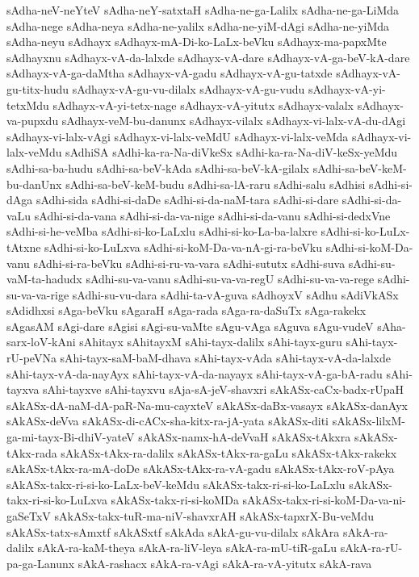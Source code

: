 {sAdha-neV-neYteV
sAdha-neY-satxtaH
sAdha-ne-ga-Lalilx
sAdha-ne-ga-LiMda
sAdha-nege
sAdha-neya
sAdha-ne-yalilx
sAdha-ne-yiM-dAgi
sAdha-ne-yiMda
sAdha-neyu
sAdhayx
sAdhayx-mA-Di-ko-LaLx-beVku
sAdhayx-ma-papxMte
sAdhayxnu
sAdhayx-vA-da-lalxde
sAdhayx-vA-dare
sAdhayx-vA-ga-beV-kA-dare
sAdhayx-vA-ga-daMtha
sAdhayx-vA-gadu
sAdhayx-vA-gu-tatxde
sAdhayx-vA-gu-titx-hudu
sAdhayx-vA-gu-vu-dilalx
sAdhayx-vA-gu-vudu
sAdhayx-vA-yi-tetxMdu
sAdhayx-vA-yi-tetx-nage
sAdhayx-vA-yitutx
sAdhayx-valalx
sAdhayx-va-pupxdu
sAdhayx-veM-bu-danunx
sAdhayx-vilalx
sAdhayx-vi-lalx-vA-du-dAgi
sAdhayx-vi-lalx-vAgi
sAdhayx-vi-lalx-veMdU
sAdhayx-vi-lalx-veMda
sAdhayx-vi-lalx-veMdu
sAdhiSA
sAdhi-ka-ra-Na-diVkeSx
sAdhi-ka-ra-Na-diV-keSx-yeMdu
sAdhi-sa-ba-hudu
sAdhi-sa-beV-kAda
sAdhi-sa-beV-kA-gilalx
sAdhi-sa-beV-keM-bu-danUnx
sAdhi-sa-beV-keM-budu
sAdhi-sa-lA-raru
sAdhi-salu
sAdhisi
sAdhi-si-dAga
sAdhi-sida
sAdhi-si-daDe
sAdhi-si-da-naM-tara
sAdhi-si-dare
sAdhi-si-da-vaLu
sAdhi-si-da-vana
sAdhi-si-da-va-nige
sAdhi-si-da-vanu
sAdhi-si-dedxVne
sAdhi-si-he-veMba
sAdhi-si-ko-LaLxlu
sAdhi-si-ko-La-ba-lalxre
sAdhi-si-ko-LuLx-tAtxne
sAdhi-si-ko-LuLxva
sAdhi-si-koM-Da-va-nA-gi-ra-beVku
sAdhi-si-koM-Da-vanu
sAdhi-si-ra-beVku
sAdhi-si-ru-va-vara
sAdhi-sututx
sAdhi-suva
sAdhi-su-vaM-ta-hadudx
sAdhi-su-va-vanu
sAdhi-su-va-va-regU
sAdhi-su-va-va-rege
sAdhi-su-va-va-rige
sAdhi-su-vu-dara
sAdhi-ta-vA-guva
sAdhoyxV
sAdhu
sAdiVkASx
sAdidhxsi
sAga-beVku
sAgaraH
sAga-rada
sAga-ra-daSuTx
sAga-rakekx
sAgasAM
sAgi-dare
sAgisi
sAgi-su-vaMte
sAgu-vAga
sAguva
sAgu-vudeV
sAha-sarx-loV-kAni
sAhitayx
sAhitayxM
sAhi-tayx-dalilx
sAhi-tayx-guru
sAhi-tayx-rU-peVNa
sAhi-tayx-saM-baM-dhava
sAhi-tayx-vAda
sAhi-tayx-vA-da-lalxde
sAhi-tayx-vA-da-nayAyx
sAhi-tayx-vA-da-nayayx
sAhi-tayx-vA-ga-bA-radu
sAhi-tayxva
sAhi-tayxve
sAhi-tayxvu
sAja-sA-jeV-shavxri
sAkASx-caCx-badx-rUpaH
sAkASx-dA-naM-dA-paR-Na-mu-cayxteV
sAkASx-daBx-vasayx
sAkASx-danAyx
sAkASx-deVva
sAkASx-di-cACx-sha-kitx-ra-jA-yata
sAkASx-diti
sAkASx-lilxM-ga-mi-tayx-Bi-dhiV-yateV
sAkASx-namx-hA-deVvaH
sAkASx-tAkxra
sAkASx-tAkx-rada
sAkASx-tAkx-ra-dalilx
sAkASx-tAkx-ra-gaLu
sAkASx-tAkx-rakekx
sAkASx-tAkx-ra-mA-doDe
sAkASx-tAkx-ra-vA-gadu
sAkASx-tAkx-roV-pAya
sAkASx-takx-ri-si-ko-LaLx-beV-keMdu
sAkASx-takx-ri-si-ko-LaLxlu
sAkASx-takx-ri-si-ko-LuLxva
sAkASx-takx-ri-si-koMDa
sAkASx-takx-ri-si-koM-Da-va-ni-gaSeTxV
sAkASx-takx-tuR-ma-niV-shavxrAH
sAkASx-tapxrX-Bu-veMdu
sAkASx-tatx-sAmxtf
sAkASxtf
sAkAda
sAkA-gu-vu-dilalx
sAkAra
sAkA-ra-dalilx
sAkA-ra-kaM-theya
sAkA-ra-liV-leya
sAkA-ra-mU-tiR-gaLu
sAkA-ra-rU-pa-ga-Lanunx
sAkA-rashacx
sAkA-ra-vAgi
sAkA-ra-vA-yitutx
sAkA-rava
}

